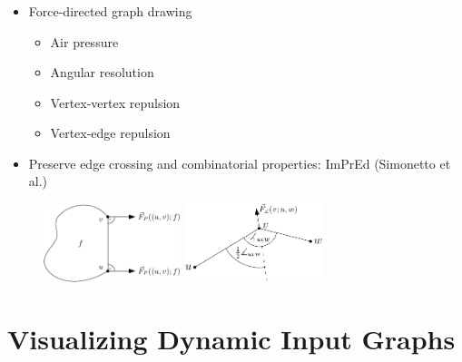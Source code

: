 \documentclass[t,18pt]{beamer}
\makeatletter
\newcommand{\etal}[0]{et al.\@}
\makeatother
\begin{document}
\begin{frame}
  \frametitle{}
  \begin{itemize}
    \item Force-directed graph drawing \begin{itemize}
      \item Air pressure
      \item Angular resolution
      \item Vertex-vertex repulsion
      \item Vertex-edge repulsion
    \end{itemize}
    \item Preserve edge crossing and combinatorial properties: ImPrEd (Simonetto \etal{})
  \end{itemize}
  \begin{figure}
    \includegraphics[width=4cm]{../Thesis/Resources/Drawing-Forces-AirPressure.pdf}
    \qquad
    \includegraphics[width=4cm]{../Thesis/Resources/Drawing-Forces-AngularResolution.pdf}
  \end{figure}
\end{frame}





\section{Visualizing Dynamic Input Graphs}
\label{sect:visualizing-dynamic-input-graphs}
\end{document}
